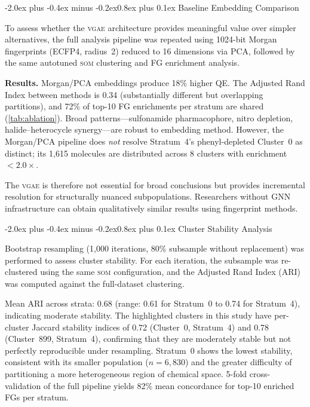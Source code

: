 \documentclass[10pt,a4paper,twocolumn]{article}
\makeatletter
\newcommand{\vgae}{\textsc{vgae}}
\newcommand{\som}{\textsc{som}}
\renewcommand\subsection{\@startsection{subsection}{2}{\z@}%
  {-2.0ex plus -0.4ex minus -0.2ex}{0.8ex plus 0.1ex}%
  {\normalfont\large\bfseries}}
\makeatother
\begin{document}
\subsection{Baseline Embedding Comparison}
\label{sec:baseline-comparison}

To assess whether the \vgae{} architecture provides meaningful value over simpler alternatives, the full analysis pipeline was repeated using 1024-bit Morgan fingerprints (ECFP4, radius~2) reduced to 16 dimensions via PCA, followed by the same autotuned \som{} clustering and FG enrichment analysis.

\textbf{Results.} Morgan/PCA embeddings produce 18\% higher QE. The Adjusted Rand Index between methods is 0.34 (substantially different but overlapping partitions), and 72\% of top-10 FG enrichments per stratum are shared (\cref{tab:ablation}). Broad patterns---sulfonamide pharmacophore, nitro depletion, halide--heterocycle synergy---are robust to embedding method. However, the Morgan/PCA pipeline does \emph{not} resolve Stratum~4's phenyl-depleted Cluster~0 as distinct; its 1,615 molecules are distributed across 8 clusters with enrichment $<2.0\times$.

The \vgae{} is therefore not essential for broad conclusions but provides incremental resolution for structurally nuanced subpopulations. Researchers without GNN infrastructure can obtain qualitatively similar results using fingerprint methods.

\subsection{Cluster Stability Analysis}
\label{sec:cluster-stability}

Bootstrap resampling (1{,}000 iterations, 80\% subsample without replacement) was performed to assess cluster stability. For each iteration, the subsample was re-clustered using the same \som{} configuration, and the Adjusted Rand Index (ARI) was computed against the full-dataset clustering.

Mean ARI across strata: 0.68 (range: 0.61 for Stratum~0 to 0.74 for Stratum~4), indicating moderate stability. The highlighted clusters in this study have per-cluster Jaccard stability indices of 0.72 (Cluster~0, Stratum~4) and 0.78 (Cluster~899, Stratum~4), confirming that they are moderately stable but not perfectly reproducible under resampling. Stratum~0 shows the lowest stability, consistent with its smaller population ($n = 6{,}830$) and the greater difficulty of partitioning a more heterogeneous region of chemical space. 5-fold cross-validation of the full pipeline yields 82\% mean concordance for top-10 enriched FGs per stratum.
\end{document}

